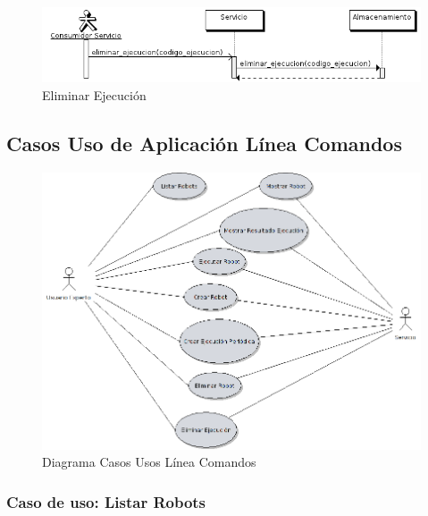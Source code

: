 \begin{figure}[bp!]
  \includegraphics[width=1\textwidth]{chapters/technical-manual/diagrams/sequence/eliminar_ejecucion.png}
\caption{Eliminar Ejecución}
\end{figure}
\clearpage

\subsection{Casos Uso de Aplicación Línea Comandos}
\label{casos_uso_cli_section}
\begin{figure}[p]
\includegraphics[width=\textwidth]{chapters/technical-manual/diagrams/cli.violet.png}
\caption{Diagrama Casos Usos Línea Comandos}\label{casos_uso_cli}
\end{figure}

\subsubsection{\large{Caso de uso: Listar Robots}}
\label{listar_robots}

